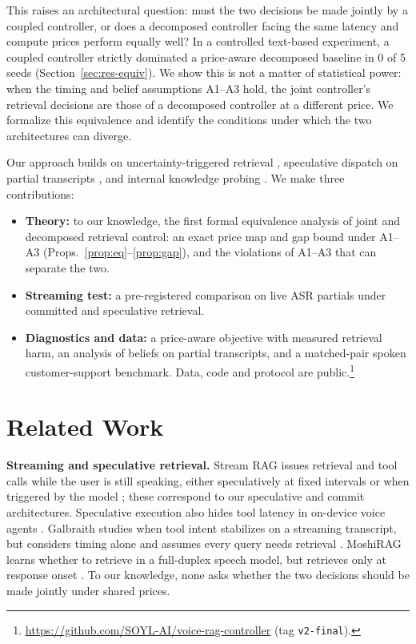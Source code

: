 This raises an architectural question: must the two decisions be made jointly by a coupled controller, or does a decomposed controller facing the same latency and compute prices perform equally well? In a controlled text-based experiment, a coupled controller strictly dominated a price-aware decomposed baseline in 0 of 5 seeds (Section~\ref{sec:res-equiv}). We show this is not a matter of statistical power: when the timing and belief assumptions A1--A3 hold, the joint controller's retrieval decisions are those of a decomposed controller at a different price. We formalize this equivalence and identify the conditions under which the two architectures can diverge.

Our approach builds on uncertainty-triggered retrieval \cite{jiang2023flare,su2024dragin}, speculative dispatch on partial transcripts \cite{arora2026streamrag,jung2026hiding}, and internal knowledge probing \cite{kadavath2022language,moskvoretskii2025adaptive}. We make three contributions:
\begin{itemize}
    \item \textbf{Theory:} to our knowledge, the first formal equivalence analysis of joint and decomposed retrieval control: an exact price map and gap bound under A1--A3 (Props.~\ref{prop:eq}--\ref{prop:gap}), and the violations of A1--A3 that can separate the two.
    \item \textbf{Streaming test:} a pre-registered comparison on live ASR partials under committed and speculative retrieval.
    \item \textbf{Diagnostics and data:} a price-aware objective with measured retrieval harm, an analysis of beliefs on partial transcripts, and a matched-pair spoken customer-support benchmark. Data, code and protocol are public.\footnote{\url{https://github.com/SOYL-AI/voice-rag-controller} (tag \texttt{v2-final}).}
\end{itemize}

\section{Related Work}\label{sec:related}

\textbf{Streaming and speculative retrieval.} Stream RAG issues retrieval and
tool calls while the user is still speaking, either speculatively at fixed
intervals or when triggered by the model \cite{arora2026streamrag}; these
correspond to our speculative and commit architectures. Speculative execution
also hides tool latency in on-device voice agents \cite{jung2026hiding}.
Galbraith studies when tool intent stabilizes on a streaming transcript, but
considers timing alone and assumes every query needs retrieval
\cite{galbraith2026streaming}. MoshiRAG learns whether to retrieve in a
full-duplex speech model, but retrieves only at response onset
\cite{chien2026moshirag}. To our knowledge, none asks whether the two
decisions should be made jointly under shared prices.

